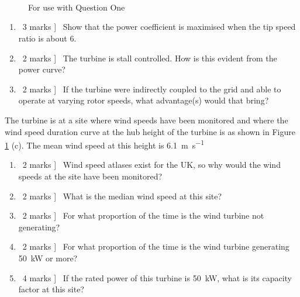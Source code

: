 \documentclass[a4paper,12pt,fleqn]{article}
\begin{document}
\begin{figure}
    \\
     \\
     \\
    \caption{For use with Question One}

\label{figure:q1}
\end{figure}


\begin{enumerate} [resume,label=\alph*)]
\item \lbrack\ 3 marks ] \ Show that the power coefficient is maximised when the tip speed ratio is about 6.
\item \lbrack\ 2 marks ] \ The turbine is stall controlled. How is this evident from the power curve?
\item \lbrack\ 2 marks ] \ If the turbine were indirectly coupled to the grid and able to operate at varying rotor speeds,
what advantage(s) would that bring?
\end{enumerate}

The turbine is at a site where wind speeds have been monitored and where the wind speed duration curve at the hub height of the turbine is as shown in 
Figure \ref{figure:q1} (c). 
The mean wind speed at this height is \SI{6.1}{\metre\per\second}

\begin{enumerate} [resume,label=\alph*)]
\item \lbrack\ 2 marks ] \ Wind speed atlases exist for the UK, so why would the wind speeds at the site have been monitored?
\item \lbrack\ 2 marks ] \ What is the median wind speed at this site?
\item \lbrack\ 2 marks ] \ For what proportion of the time is the wind turbine not generating?
\item \lbrack\ 2 marks ] \ For what proportion of the time is the wind turbine generating \SI{50}{\kilo\watt} or more?
\item \lbrack\ 4 marks ] \ If the rated power of this turbine is \SI{50}{\kilo\watt}, what is its capacity factor at this site?
\end{enumerate}
\end{document}

